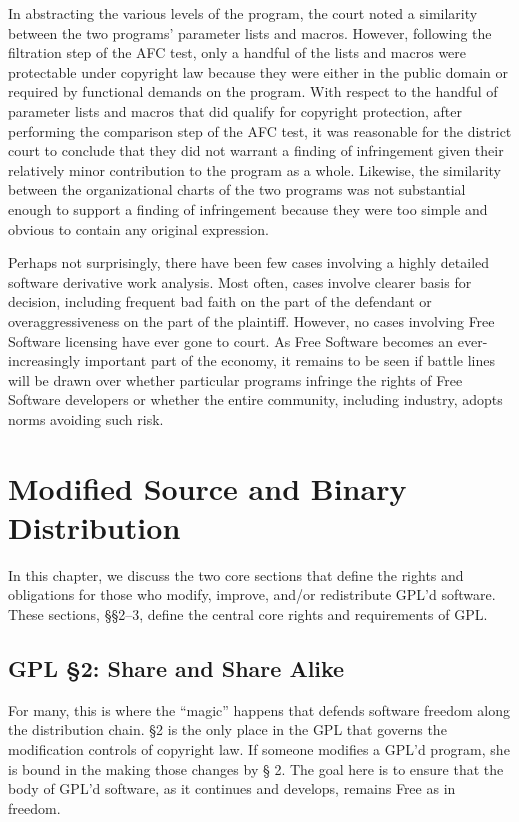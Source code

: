 \documentclass[11pt, letterpaper]{book}
\begin{document}
In abstracting the various levels of the program, the court noted a
similarity between the two programs' parameter lists and macros. However,
following the filtration step of the AFC test, only a handful of the lists
and macros were protectable under copyright law because they were either
in the public domain or required by functional demands on the
program. With respect to the handful of parameter lists and macros that
did qualify for copyright protection, after performing the comparison step
of the AFC test, it was reasonable for the district court to conclude that
they did not warrant a finding of infringement given their relatively minor
contribution to the program as a whole. Likewise, the similarity between
the organizational charts of the two programs was not substantial enough
to support a finding of infringement because they were too simple and
obvious to contain any original expression.

Perhaps not surprisingly, there have been few cases involving a highly
detailed software derivative work analysis. Most often, cases involve
clearer basis for decision, including frequent bad faith on the part of
the defendant or overaggressiveness on the part of the plaintiff.
However, no cases involving Free Software licensing have ever gone to
court. As Free Software becomes an ever-increasingly important part of
the economy, it remains to be seen if battle lines will be
drawn over whether particular programs infringe the rights of Free
Software developers or whether the entire community, including industry,
adopts norms avoiding such risk.


\chapter{Modified Source and Binary Distribution}
\label{source-and-binary}

In this chapter, we discuss the two core sections that define the rights
and obligations for those who modify, improve, and/or redistribute GPL'd
software. These sections, \S\S 2--3, define the central core rights and
requirements of GPL\@.

\section{GPL \S 2: Share and Share Alike}

For many, this is where the ``magic'' happens that defends software
freedom along the distribution chain. \S 2 is the only place in the GPL
that governs the modification controls of copyright law. If someone
modifies a GPL'd program, she is bound in the making those changes by \S
2. The goal here is to ensure that the body of GPL'd software, as it
continues and develops, remains Free as in freedom.
\end{document}
